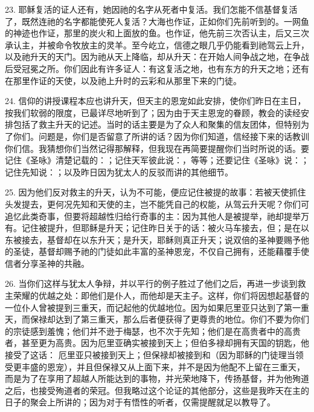 23. 耶稣复活的证人还有，她因祂的名字从死者中复活。我们怎能不信基督复活了，既然连祂的名字都能使死人复活？大海也作证，正如你们先前听到的。一网鱼的神迹也作证，那里的炭火和上面放的鱼。也作证，他先前三次否认主，后又三次承认主，并被命令牧放主的灵羊。至今屹立，信德之眼几乎仍能看到祂驾云上升，以及祂升天的天门。因为祂从天上降临，却从升天：在开始人间争战之地，在争战后受冠冕之所。你们因此有许多证人：有这复活之地，也有东方的升天之地；还有在那里作证的天使，以及祂上升时的云彩和从那里下来的门徒。\par

24. 信仰的讲授课程本应也讲升天，但天主的恩宠如此安排，使你们昨日在主日，按我们软弱的限度，已最详尽地听到了；因为由于天主恩宠的眷顾，教会的读经安排包括了救主升天的记述。当时的话主要是为了众人和聚集的信友团体，但特别为了你们。问题是，你们是否留意了所讲的话？因为你们知道，信经接下来的话教训你们信。我猜想你们当然记得那解释，但我现在再简要提醒你们当时所说的话。要记住《圣咏》清楚记载的：；记住天军彼此说：，等等；还要记住《圣咏》说：；记住先知说：；以及昨日因为犹太人的反驳而讲的其他细节。\par

25. 因为他们反对救主的升天，认为不可能，便应记住被提的故事：若被天使抓住头发提去，更何况先知和天使的主，岂不能凭自己的权能，从驾云升天呢？你们可追忆此类奇事，但要将超越性归给行奇事的主：因为其他人是被提举，祂却提举万有。记住被提升，但耶稣是升天；记住昨日关于的话：被火马车接去，但；是在以东被接去，基督却在以东升天；是升天，耶稣则真正升天；说双倍的圣神要赐予他的圣徒，基督却赐予祂的门徒如此丰富的圣神恩宠，不仅自己拥有，还能藉覆手使信者分享圣神的共融。\par

26. 当你们这样与犹太人争辩，并以平行的例子胜过了他们之后，再进一步谈到救主荣耀的优越之处：即他们是仆人，而他却是天主子。这样，你们将因想起基督的一位仆人曾被提到三重天，而记起他的优越地位。因为如果厄里亚只达到了第一重天，而保禄却达到了第三重天，那么后者便获得了更尊贵的地位。你们不要为你们的宗徒感到羞愧；他们并不逊于梅瑟，也不次于先知；他们是在高贵者中的高贵者，甚至更为高贵。因为厄里亚确实被接到天上；但伯多禄却拥有天国的钥匙，他接受了这话： 厄里亚只被接到天上；但保禄却被接到和（因为耶稣的门徒理当领受更丰盛的恩宠），并且但保禄又从上面下来，并不是因为他配不上留在三重天，而是为了在享用了超越人所能达到的事物，并光荣地降下，传扬基督，并为他殉道之后，也接受殉道者的荣冠。但我略过这个论证的其他部分，这些是我昨天在主的日子的聚会上所讲的；因为对于有悟性的听者，仅需提醒就足以教导了。\par


